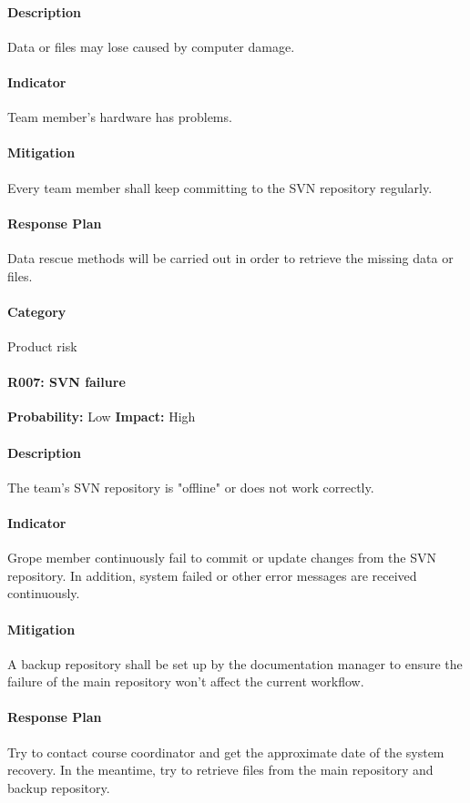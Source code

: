 \documentclass[11pt, a4paper]{report}
\begin{document}
	\paragraph{Description}Data or files may lose caused by computer damage.
	\paragraph{Indicator}Team member's hardware has problems. 
	\paragraph{Mitigation}Every team member shall keep committing to the SVN repository regularly.
	\paragraph{Response Plan}Data rescue methods will be carried out in order to retrieve the missing data or files.\\
	\paragraph{Category} Product risk
	
	\paragraph{R007: SVN failure} \hspace{1cm} \textbf{Probability: }Low\hspace{1cm}   \textbf{Impact: }High
	\paragraph{Description}The team's SVN repository is "offline" or does not work correctly.
	\paragraph{Indicator}Grope member continuously fail to commit or update changes from the SVN repository. In addition, system failed or other error messages are received continuously.
	\paragraph{Mitigation}A backup repository shall be set up by the documentation manager to ensure the failure of the main repository won't affect the current workflow.
	\paragraph{Response Plan}Try to contact course coordinator and get the approximate date of the system recovery. In the meantime, try to retrieve files from the main repository and backup repository.\\
\end{document}
